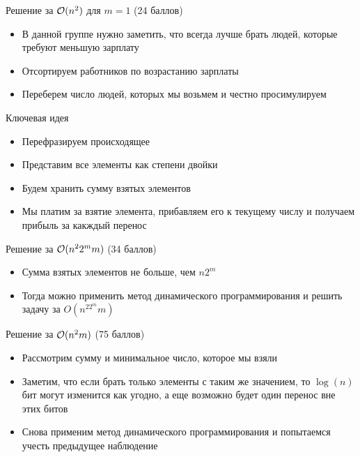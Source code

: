 \begin{frame}{Решение за $\mathcal{O}(n^2)$ для $m = 1$ (24 баллов)}
  \begin{itemize}
  \item В данной группе нужно заметить, что всегда лучше брать людей, которые требуют меньшую зарплату 
  \item Отсортируем работников по возрастанию зарплаты 
  \item Переберем число людей, которых мы возьмем и честно просимулируем
  \end{itemize}
\end{frame}

\begin{frame}{Ключевая идея}
  \begin{itemize}
  \item Перефразируем происходящее 
  \item Представим все элементы как степени двойки
  \item Будем хранить сумму взятых элементов
  \item Мы платим за взятие элемента, прибавляем его к текущему числу и получаем прибыль за какждый перенос
  \end{itemize} 
\end{frame}

\begin{frame}{Решение за $\mathcal{O}(n^22^mm)$ (34 баллов)}
  \begin{itemize}
  \item Сумма взятых элементов не больше, чем $n2^m$
  \item Тогда можно применить метод динамического программирования и
  решить задачу за $O(n^22^mm)$
  \end{itemize}
\end{frame}

\begin{frame}{Решение за $\mathcal{O}(n^2m)$ (75 баллов)}
  \begin{itemize}
  \item Рассмотрим сумму и минимальное число, которое мы взяли
  \item Заметим, что если брать только элементы с таким же значением, то $\log(n)$ бит могут изменится как угодно, а еще возможно будет один перенос вне этих битов
  \item Снова применим метод динамического программирования и попытаемся учесть предыдущее наблюдение
  \end{itemize}
\end{frame}

